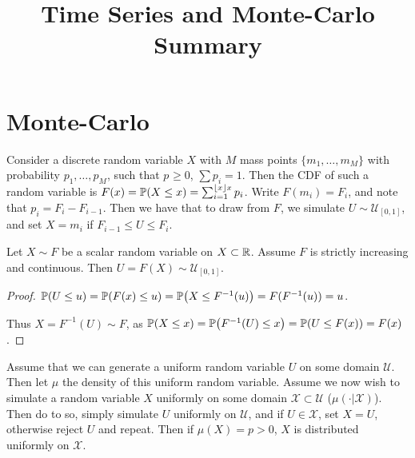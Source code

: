 

\title{Time Series and Monte-Carlo Summary}



\maketitle

\section{Monte-Carlo}
\label{sec:monte-carlo}

\begin{thm}
  \label{sec:monte-carlo-2}
  Consider a discrete random variable $X$ with $M$ mass points $\{
  m_{1}, \dots, m_{M} \}$ with probability $p_{1}, \dots, p_{M}$, such
  that $p_{} \geq 0$, $\sum p_{i} = 1$.  Then the CDF of such a random
  variable is $F(x) = \Prob{X \leq x} = \sum_{i=1}^{\lfloor x \rfloor
    x} p_{i}$.  Write $F(m_{i}) = F_{i}$, and note that $p_{i} = F_{i}
  - F_{i-1}$.  Then we have that to draw from $F$, we simulate $U \sim
  \mathcal{U}_{[0, 1]}$, and set $X = m_{i}$ if $F_{i-1} \leq U \leq F_{i}$.
\end{thm}

\begin{thm}
  \label{sec:monte-carlo-3}
  Let $X \sim F$ be a scalar random variable on $X \subset \mathbb{R}$.
  Assume $F$ is strictly increasing and continuous.  Then $U = F(X)
  \sim \mathcal{U}_{[0, 1]}$.
\end{thm}

\begin{proof}
  $\Prob{U \leq u} = \Prob{F(x) \leq u} = \Prob{X \leq F^{-1}(u)} =
  F(F^{-1}(u)) = u$.

  Thus $X = F^{-1}(U) \sim F$, as $\Prob{X \leq x} = \Prob{F^{-1}(U)
    \leq x} = \Prob{U \leq F(x)} = F(x)$.
\end{proof}

\begin{defn}
  \label{sec:monte-carlo-4}
  Assume that we can generate a uniform random variable $U$ on some
  domain $\mathcal{U}$.  Then let $\mu$ the density of this uniform
  random variable.  Assume we now wish to simulate a random variable
  $X$ uniformly on some domain $\mathcal{X} \subset \mathcal{U}$ ($\mu
  (\cdot | \mathcal{X})$).  Then do to so, simply simulate $U$
  uniformly on $\mathcal{U}$, and if $U \in \mathcal{X}$, set $X = U$,
  otherwise reject $U$ and repeat.  Then if $\mu(X) = p > 0$, $X$ is
  distributed uniformly on $\mathcal{X}$.
\end{defn}

